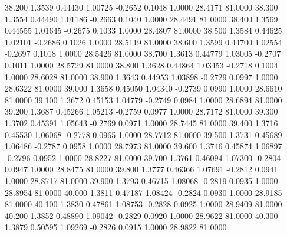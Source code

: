   38.200   1.3539   0.44430   1.00725  -0.2652   0.1048   1.0000  28.4171  81.0000
  38.300   1.3554   0.44490   1.01186  -0.2663   0.1040   1.0000  28.4491  81.0000
  38.400   1.3569   0.44555   1.01645  -0.2675   0.1033   1.0000  28.4807  81.0000
  38.500   1.3584   0.44625   1.02101  -0.2686   0.1026   1.0000  28.5119  81.0000
  38.600   1.3599   0.44700   1.02554  -0.2697   0.1018   1.0000  28.5426  81.0000
  38.700   1.3613   0.44779   1.03005  -0.2707   0.1011   1.0000  28.5729  81.0000
  38.800   1.3628   0.44864   1.03453  -0.2718   0.1004   1.0000  28.6028  81.0000
  38.900   1.3643   0.44953   1.03898  -0.2729   0.0997   1.0000  28.6322  81.0000
  39.000   1.3658   0.45050   1.04340  -0.2739   0.0990   1.0000  28.6610  81.0000
  39.100   1.3672   0.45153   1.04779  -0.2749   0.0984   1.0000  28.6894  81.0000
  39.200   1.3687   0.45266   1.05213  -0.2759   0.0977   1.0000  28.7172  81.0000
  39.300   1.3702   0.45391   1.05643  -0.2769   0.0971   1.0000  28.7445  81.0000
  39.400   1.3716   0.45530   1.06068  -0.2778   0.0965   1.0000  28.7712  81.0000
  39.500   1.3731   0.45689   1.06486  -0.2787   0.0958   1.0000  28.7973  81.0000
  39.600   1.3746   0.45874   1.06897  -0.2796   0.0952   1.0000  28.8227  81.0000
  39.700   1.3761   0.46094   1.07300  -0.2804   0.0947   1.0000  28.8475  81.0000
  39.800   1.3777   0.46366   1.07691  -0.2812   0.0941   1.0000  28.8717  81.0000
  39.900   1.3793   0.46715   1.08068  -0.2819   0.0935   1.0000  28.8954  81.0000
  40.000   1.3811   0.47187   1.08424  -0.2824   0.0930   1.0000  28.9185  81.0000
  40.100   1.3830   0.47861   1.08753  -0.2828   0.0925   1.0000  28.9409  81.0000
  40.200   1.3852   0.48890   1.09042  -0.2829   0.0920   1.0000  28.9622  81.0000
  40.300   1.3879   0.50595   1.09269  -0.2826   0.0915   1.0000  28.9822  81.0000
